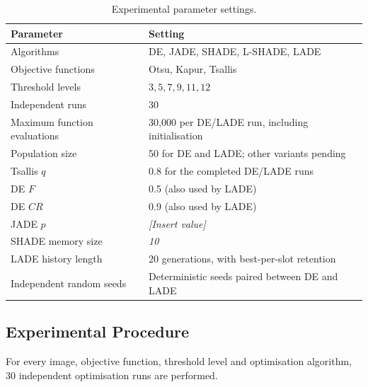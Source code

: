 \documentclass[review]{elsarticle}
\begin{document}
\begin{table}[H]
\caption{Experimental parameter settings.}
\label{tab:parameters}
\centering

\begin{tabular}{lp{}}
\toprule
\textbf{Parameter} & \textbf{Setting} \\
\midrule

Algorithms &
DE, JADE, SHADE, L-SHADE, LADE \\

Objective functions &
Otsu, Kapur, Tsallis \\

Threshold levels &
$3,5,7,9,11,12$ \\

Independent runs &
30 \\

Maximum function evaluations &
30,000 per DE/LADE run, including initialisation \\

Population size &
50 for DE and LADE; other variants pending \\

Tsallis $q$ &
0.8 for the completed DE/LADE runs \\

DE $F$ &
0.5 (also used by LADE) \\

DE $CR$ &
0.9 (also used by LADE) \\

JADE $p$ &
\textit{[Insert value]} \\

SHADE memory size &
\textit{10} \\

LADE history length &
20 generations, with best-per-slot retention \\

Independent random seeds &
Deterministic seeds paired between DE and LADE \\

\bottomrule
\end{tabular}

\end{table}


\subsection{Experimental Procedure}

For every image, objective function, threshold level and optimisation
algorithm, 30 independent optimisation runs are performed.
\end{document}
